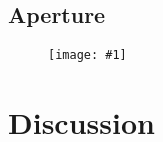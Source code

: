 \documentclass[onecolumn,galley]{mn2e}
\newcommand{\figref}[1] {Figure~\ref{#1}}
\newcommand\plotone[1]{%
 \centering
 \leavevmode
 \texttt{[image: \#1]}%
}%
\begin{document}
%
%
%
%
%
%
%
%
%


\subsection{Aperture}

\begin{figure}
\plotone{sigma_beta.pdf}
\caption{}
\end{figure}

\section{Discussion} %
\end{document}
